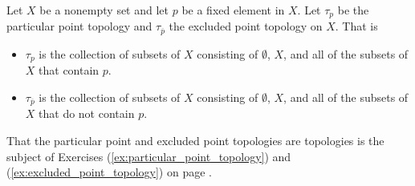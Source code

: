 \begin{comment}

\ExerciseSolution

\ba

\item The identification $(s_1, t_1) \sim (s_2,t_2)$ when $t_1 = t_2 > 0$ collapses all bu the bottom edge of $X$ to a half open line segment of the form $(0,1]$. So $X/\ssim$ can be thought of as a horizontal line segment $K = [0,1]$ with a line segment $J = (0,1]$ attached vertically. The subsets of $J$ whose inverse images are open sets are the open subintervals of $J$. The subsets of $K$ whose inverse images are open sets are the open intervals in $K$ along with open intervals in $J$ of the form $(0,r)$, where $r$ is the radius of the given interval, as illustrated in Figure \ref{F:Quotient_Homework_Segments}.  
\begin{figure}[h]
\begin{center}
\resizebox{!}{1.0in}{\texttt{[image: Quotient\_Homework\_Segments.eps]}}
\caption{The quotient space.} 
\label{F:Quotient_Homework_Segments}
\end{center}
\end{figure}

\item If $a$ and $b$ are points in $K$, then any open sets $O_a$ and $O_b$ containing $a$ and $b$ also contain an open interval in $J$. So it is impossible to separate two points in $K$ with open sets in $X/\ssim$ and so $X/\ssim$ is not Hausdorff. 

\ea

\end{comment}

\item Let $X$ be a nonempty set and let $p$ be a fixed element in $X$. Let $\tau_p$ be the particular point topology and $\tau_{\overline{p}}$ the excluded point topology on $X$. That is
\begin{itemize}
\item $\tau_{p}$ is the collection of subsets of $X$ consisting of $\emptyset$, $X$, and all of the subsets of $X$ that contain $p$.  
\item $\tau_{\overline{p}}$ is the collection of subsets of $X$ consisting of $\emptyset$, $X$, and all of the subsets of $X$ that do not contain $p$.
\end{itemize}
That the particular point and excluded point topologies are topologies is the subject of Exercises (\ref{ex:particular_point_topology}) and (\ref{ex:excluded_point_topology}) on page \pageref{ex:particular_point_topology}. 

